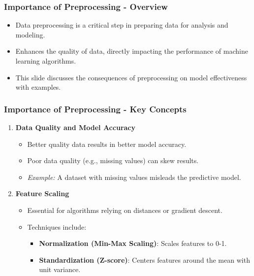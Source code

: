 \documentclass[aspectratio=169]{beamer}
\begin{document}
\begin{frame}[fragile]
    \frametitle{Importance of Preprocessing - Overview}
    \begin{itemize}
        \item Data preprocessing is a critical step in preparing data for analysis and modeling.
        \item Enhances the quality of data, directly impacting the performance of machine learning algorithms.
        \item This slide discusses the consequences of preprocessing on model effectiveness with examples.
    \end{itemize}
\end{frame}

\begin{frame}[fragile]
    \frametitle{Importance of Preprocessing - Key Concepts}
    \begin{enumerate}
        \item \textbf{Data Quality and Model Accuracy}
        \begin{itemize}
            \item Better quality data results in better model accuracy.
            \item Poor data quality (e.g., missing values) can skew results.
            \item \textit{Example:} A dataset with missing values misleads the predictive model.
        \end{itemize}
        \item \textbf{Feature Scaling}
        \begin{itemize}
            \item Essential for algorithms relying on distances or gradient descent.
            \item Techniques include:
            \begin{itemize}
                \item \textbf{Normalization (Min-Max Scaling)}: Scales features to 0-1.
                \item \textbf{Standardization (Z-score)}: Centers features around the mean with unit variance.
            \end{itemize}
        \end{itemize}
    \end{enumerate}
\end{frame}
\end{document}
